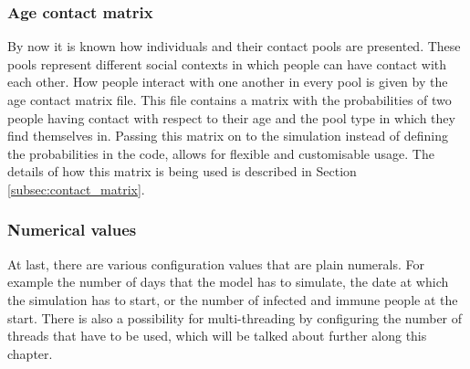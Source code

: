 \subsubsection{Age contact matrix}
By now it is known how individuals and their contact pools are presented. These pools represent different social contexts in which people can have contact with each other. How people interact with one another in every pool is given by the age contact matrix file. This file contains a matrix with the probabilities of two people having contact with respect to their age and the pool type in which they find themselves in. Passing this matrix on to the simulation instead of defining the probabilities in the code, allows for flexible and customisable usage. The details of how this matrix is being used is described in Section \ref{subsec:contact_matrix}.

\subsubsection{Numerical values}
At last, there are various configuration values that are plain numerals. For example the number of days that the model has to simulate, the date at which the simulation has to start, or the number of infected and immune people at the start. There is also a possibility for multi-threading by configuring the number of threads that have to be used, which will be talked about further along this chapter.

